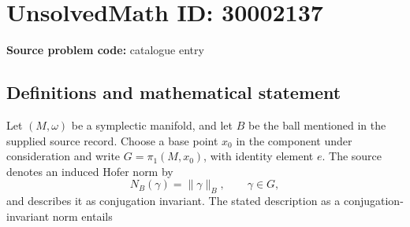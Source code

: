 \documentclass[11pt]{article}
\begin{document}
\section*{UnsolvedMath ID: 30002137}
\textbf{Source problem code:} catalogue entry
\subsection{Definitions and mathematical statement}
Let \((M,\omega)\) be a symplectic manifold, and let \(B\) be the ball mentioned in the supplied source record. Choose a base point \(x_0\) in the component under consideration and write \(G=\pi_1(M,x_0)\), with identity element \(e\). The source denotes an induced Hofer norm by
\[
N_B(\gamma)=\lVert\gamma\rVert_B,\qquad \gamma\in G,
\]
and describes it as conjugation invariant. The stated description as a conjugation-invariant norm entails
\end{document}
